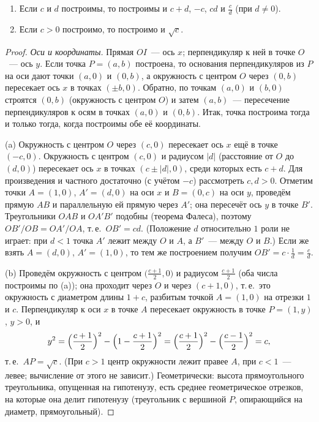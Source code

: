 \begin{lemma}[1.36]
\begin{enumerate}[label=(\alph*)]
\item Если $c$ и $d$ построимы, то построимы и $c+d$, $-c$, $cd$ и $\frac cd$ (при $d\ne0$).
\item Если $c>0$ построимо, то построимо и $\sqrt c$.
\end{enumerate}
\end{lemma}

\begin{proof}
\emph{Оси и координаты.} Прямая $OI$~--- ось $x$; перпендикуляр к ней в точке $O$~--- ось $y$. Если точка $P=(a,b)$
построена, то основания перпендикуляров из $P$ на оси дают точки $(a,0)$ и $(0,b)$, а окружность с центром $O$ через
$(0,b)$ пересекает ось $x$ в точках $(\pm b,0)$. Обратно, по точкам $(a,0)$ и $(b,0)$ строятся $(0,b)$ (окружность с
центром $O$) и затем $(a,b)$~--- пересечение перпендикуляров к осям в точках $(a,0)$ и $(0,b)$. Итак, точка построима
тогда и только тогда, когда построимы обе её координаты.

(a) Окружность с центром $O$ через $(c,0)$ пересекает ось $x$ ещё в точке $(-c,0)$. Окружность с центром $(c,0)$ и
радиусом $|d|$ (расстояние от $O$ до $(d,0)$) пересекает ось $x$ в точках $(c\pm|d|,0)$, среди которых есть $c+d$. Для
произведения и частного достаточно (с учётом $-c$) рассмотреть $c,d>0$. Отметим точки $A=(1,0)$, $A'=(d,0)$ на оси
$x$ и $B=(0,c)$ на оси $y$, проведём прямую $AB$ и параллельную ей прямую через $A'$; она пересечёт ось $y$ в точке
$B'$. Треугольники $OAB$ и $OA'B'$ подобны (теорема Фалеса), поэтому $OB'/OB=OA'/OA$, т.\,е.\ $OB'=cd$. (Положение $d$
относительно $1$ роли не играет: при $d<1$ точка $A'$ лежит между $O$ и $A$, а $B'$~--- между $O$ и $B$.) Если же взять
$A=(d,0)$, $A'=(1,0)$, то тем же построением получим $OB'=c\cdot\frac1d=\frac cd$.

(b) Проведём окружность с центром $\bigl(\frac{c+1}2,0\bigr)$ и радиусом $\frac{c+1}2$ (оба числа построимы по (a)); она
проходит через $O$ и через $(c+1,0)$, т.\,е.\ это окружность с диаметром длины $1+c$, разбитым точкой $A=(1,0)$ на
отрезки $1$ и $c$. Перпендикуляр к оси $x$ в точке $A$ пересекает окружность в точке $P=(1,y)$, $y>0$, и
\[
y^2=\Bigl(\frac{c+1}2\Bigr)^2-\Bigl(1-\frac{c+1}2\Bigr)^2=\Bigl(\frac{c+1}2\Bigr)^2-\Bigl(\frac{c-1}2\Bigr)^2=c,
\]
т.\,е.\ $AP=\sqrt c$. (При $c>1$ центр окружности лежит правее $A$, при $c<1$~--- левее; вычисление от этого не
зависит.) Геометрически: высота прямоугольного треугольника, опущенная на гипотенузу, есть среднее
геометрическое отрезков, на которые она делит гипотенузу (треугольник с вершиной $P$, опирающийся на диаметр,
прямоугольный).
\end{proof}

